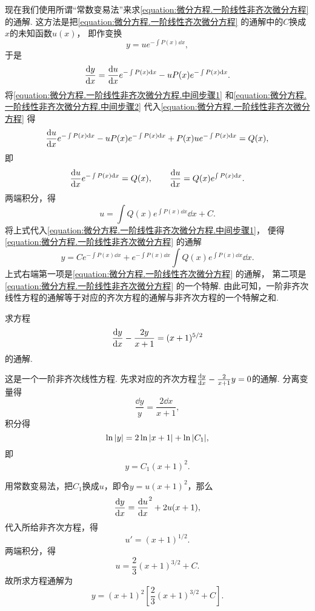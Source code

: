 现在我们使用所谓“常数变易法”来求\cref{equation:微分方程.一阶线性非齐次微分方程} 的通解.
这方法是把\cref{equation:微分方程.一阶线性齐次微分方程} 的通解中的\(C\)换成\(x\)的未知函数\(u(x)\)，
即作变换\begin{equation}\label{equation:微分方程.一阶线性非齐次微分方程.中间步骤1}
	y = u e^{ -\int P(x)\dd{x} },
\end{equation}
于是\begin{equation}\label{equation:微分方程.一阶线性非齐次微分方程.中间步骤2}
	\dv{y}{x} = \dv{u}{x} e^{ -\int P(x) \dd{x} } - u P(x) e^{ -\int P(x) \dd{x} }.
\end{equation}
将\cref{equation:微分方程.一阶线性非齐次微分方程.中间步骤1}
和\cref{equation:微分方程.一阶线性非齐次微分方程.中间步骤2}
代入\cref{equation:微分方程.一阶线性非齐次微分方程}
得\[
	\dv{u}{x} e^{ -\int P(x) \dd{x} }
	- u P(x) e^{ -\int P(x) \dd{x} }
	+ P(x) u e^{ -\int P(x) \dd{x} }
	= Q(x),
\]
即\[
	\dv{u}{x} e^{ -\int P(x) \dd{x} } = Q(x),
	\qquad
	\dv{u}{x} = Q(x) e^{ \int P(x) \dd{x} }.
\]
两端积分，得\[
	u = \int Q(x) e^{ \int P(x) \dd{x} } \dd{x} + C.
\]
将上式代入\cref{equation:微分方程.一阶线性非齐次微分方程.中间步骤1}，
便得\cref{equation:微分方程.一阶线性非齐次微分方程} 的通解\begin{equation}\label{equation:微分方程.一阶线性非齐次微分方程的通解}
	y = C e^{ -\int P(x) \dd{x} }
	+ e^{ -\int P(x) \dd{x} } \int Q(x) e^{ \int P(x) \dd{x} } \dd{x}.
\end{equation}
上式右端第一项是\cref{equation:微分方程.一阶线性齐次微分方程} 的通解，
第二项是\cref{equation:微分方程.一阶线性非齐次微分方程} 的一个特解.
由此可知，一阶非齐次线性方程的通解等于对应的齐次方程的通解与非齐次方程的一个特解之和.

\begin{example}
求方程\[
	\dv{y}{x} - \frac{2y}{x+1} = (x+1)^{5/2}
\]的通解.
\begin{solution}
这是一个一阶非齐次线性方程.
先求对应的齐次方程\(\dv{y}{x} - \frac{2}{x+1} y = 0\)的通解.
分离变量得\[
	\frac{\dd{y}}{y} = \frac{2 \dd{x}}{x+1},
\]
积分得\[
	\ln\abs{y} = 2\ln\abs{x+1}+ \ln\abs{C_1},
\]
即\[
	y = C_1 (x+1)^2.
\]

用常数变易法，把\(C_1\)换成\(u\)，即令\(y = u(x+1)^2\)，那么\[
	\dv{y}{x} = \dv{u}{x} (x+1)^2 + 2u(x+1),
\]
代入所给非齐次方程，得\[
	u' = (x+1)^{1/2}.
\]
两端积分，得\[
	u = \frac{2}{3} (x+1)^{3/2} + C.
\]
故所求方程通解为\[
	y = (x+1)^2 \left[
	\frac{2}{3} (x+1)^{3/2} + C
	\right].
\]
\end{solution}
\end{example}

